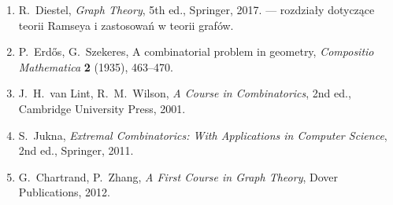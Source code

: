 \documentclass[12pt,a4paper]{article}
\begin{document}
\begin{itemize}
\begin{enumerate}[leftmargin=2em]
    \item R.\ Diestel,
    \emph{Graph Theory}, 5th ed., Springer, 2017.
    --- rozdziały dotyczące teorii Ramseya i zastosowań w teorii grafów.

    \item P.\ Erd\H{o}s, G.\ Szekeres,
    A combinatorial problem in geometry,
    \emph{Compositio Mathematica} \textbf{2} (1935), 463--470.

    \item J.\ H.\ van Lint, R.\ M.\ Wilson,
    \emph{A Course in Combinatorics}, 2nd ed., Cambridge University Press,
    2001.

    \item S.\ Jukna,
    \emph{Extremal Combinatorics: With Applications in Computer Science},
    2nd ed., Springer, 2011.

    \item G.\ Chartrand, P.\ Zhang,
    \emph{A First Course in Graph Theory}, Dover Publications, 2012.
  \end{enumerate}
  \end{itemize}
\end{document}
